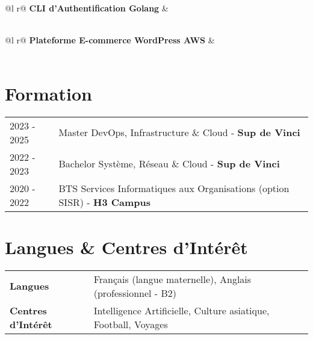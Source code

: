 \documentclass[a4paper,12pt]{article}
\begin{document}
\vspace{4pt}


\begin{tabularx}{\linewidth}{ @{}l r@{} }
\textbf{CLI d’Authentification Golang} & \hfill  \\
  \\
\end{tabularx}


\vspace{4pt}


\begin{tabularx}{\linewidth}{ @{}l r@{} }
\textbf{Plateforme E-commerce WordPress AWS} & \hfill  \\
  \\
\end{tabularx}


\section{Formation}
\begin{tabularx}{\linewidth}{@{}l X@{}} 
2023 - 2025 & Master DevOps, Infrastructure \& Cloud - \textbf{Sup de Vinci} \\
2022 - 2023 & Bachelor Système, Réseau \& Cloud - \textbf{Sup de Vinci} \\
2020 - 2022 & BTS Services Informatiques aux Organisations (option SISR) - \textbf{H3 Campus} \\
\end{tabularx}


\section{Langues \& Centres d'Intérêt}
\begin{tabularx}{\linewidth}{@{}l X@{}}
\textbf{Langues} & Français (langue maternelle), Anglais (professionnel - B2)\\
\textbf{Centres d'Intérêt} & Intelligence Artificielle, Culture asiatique, Football, Voyages\\
\end{tabularx}
\end{document}
